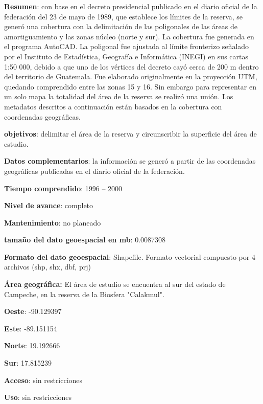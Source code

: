 \documentclass[twoside]{book}
\begin{document}
\textbf{Resumen}: con base en el decreto presidencial publicado en el diario oficial de la federación del 23 de mayo de 1989, que establece los límites de la reserva, se generó una cobertura con la
delimitación de las poligonales de las áreas de amortiguamiento y las zonas núcleo (norte y
sur). La cobertura fue generada en el programa AutoCAD. La poligonal fue ajustada al límite
fronterizo señalado por el Instituto de Estadística, Geografía e Informática (INEGI) en sus
cartas 1:50 000, debido a que uno de los vértices del decreto cayó cerca de 200 m dentro del
territorio de Guatemala. Fue elaborado originalmente en la proyección UTM, quedando
comprendido entre las zonas 15 y 16. Sin embargo para representar en un solo mapa la
totalidad del área de la reserva se realizó una unión. Los metadatos descritos a continuación
están basados en la cobertura con coordenadas geográficas.

\textbf{objetivos}: delimitar el área de la reserva y circunscribir la superficie del área de estudio.

\textbf{Datos complementarios}: la información se generó a partir de las coordenadas geográficas publicadas en el diario oficial de la federación.

\textbf{Tiempo comprendido}: 1996 – 2000

\textbf{Nivel de avance}: completo

\textbf{Mantenimiento}: no planeado

\textbf{tamaño del dato geoespacial en mb}: 0.0087308

\textbf{Formato del dato geoespacial}: Shapefile. Formato vectorial compuesto por 4 archivos (shp, shx, dbf, prj)

\textbf{Área geográfica:} El área de estudio se encuentra al sur del estado de Campeche, en la reserva de la Biosfera "Calakmul".


\textbf{Oeste}: -90.129397

\textbf{Este}: -89.151154

\textbf{Norte}: 19.192666

\textbf{Sur}: 17.815239


\textbf{Acceso}: sin restricciones

\textbf{Uso}: sin restricciones
\end{document}
